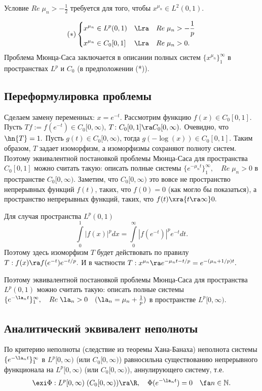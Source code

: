 \documentclass[a4paper]{article}
\begin{document}
Условие $Re\;\mu_n>-\frac12$ требуется для того, чтобы
$x^{\mu_n}\in L^2(0,1).$

$$(*)\left\{
\begin{aligned}
&x^{\mu_n}\in L^p(0,1)&\Lra \quad&Re\;\mu_n>-\frac1p\\
&x^{\mu_n}\in C_0[0,1]&\Lra \quad&Re\;\mu_n>0.
\end{aligned}
\right.
$$
Проблема Мюнца-Саса заключается в описании полных систем
$\{x^{\mu_n}\}_1^{\infty}$ в пространствах $L^p$ и $C_0$ (в
предположении (*)).

\subsection{Переформулировка проблемы}
Сделаем замену переменных: $x=e^{-t}$. Рассмотрим функцию $f(x)\in
C_0[0,1].$ Пусть $Tf:=f(e^{-t})\in C_0[0,\infty)$, $T\colon
C_0[0,1]\ra C_0[0,\infty).$ Очевидно, что $\hn{T}=1.$
Пусть $g(t)\in C_0[0,\infty)$, тогда $g(-\log(x))\in C_0[0,1].$
Таким образом, $T$ задает изоморфизм, а изоморфизмы сохраняют
полноту систем. Поэтому эквивалентной постановкой проблемы
Мюнца-Саса для пространства $C_0[0,1]$ можно считать такую:
описать полные системы $\{e^{-\mu_n t}\}_1^{\infty},\quad
Re\;\mu_n>0$ в пространстве $C_0[0,\infty).$ Заметим, что
$C_0[0,\infty)$ это вовсе не пространство непрерывных функций
$f(t)$, таких, что $f(0)=0$ (как могло бы показаться), а
пространство непрерывных функций, таких, что
$f(t)\xra{t\ra\infty}0.$

Для случая пространства $L^p(0,1)$
$$\int\limits_0^1|f(x)|^pdx=\int\limits_0^{\infty}|f(e^{-t})|^pe^{-t}dt.$$
Поэтому здесь изоморфизм $T$ будет действовать по правилу
$T:f(x)\ra f(e^{-t})e^{-t/p}.$ И в частности $T:
x^{\mu_n}\ra e^{-\mu_n t-t/p}=e^{-(\mu_n+1/p)t}.$

Поэтому эквивалентной постановкой проблемы Мюнца-Саса для
пространства $L^p(0,1)$ можно считать такую: описать полные
системы $\{e^{-\la_n t}\}_1^{\infty},\quad
Re\;\la_n>0\quad(\la_n=\mu_n+\frac1p)$ в пространстве
$L^p[0,\infty).$

\subsection{Аналитический эквивалент неполноты}
По критерию неполноты (следствие из теоремы Хана-Банаха) неполнота
системы $\{e^{-\la_n t}\}_1^{\infty}$ в $L^p[0,\infty)$
(или $C_0[0,\infty)$) равносильна существованию непрерывного
функционала на $L^p[0,\infty)$ (или $C_0[0,\infty)$), аннулирующего
систему, т.е.
$$\exi \Phi:L^p[0,\infty)\; (C_0[0,\infty))\ra
\R ,\quad \Phi(e^{-\la_n t})=0\quad\fa
n\in\mathbb{N}.$$
\end{document}
